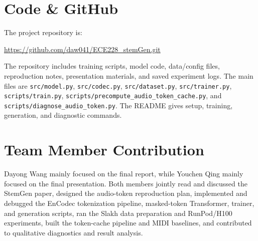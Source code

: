 \documentclass{article}
\begin{document}
\section{Code \& GitHub}

The project repository is:
\begin{center}
\url{https://github.com/daw041/ECE228_stemGen.git}
\end{center}
The repository includes training scripts, model code, data/config files, reproduction notes, presentation materials, and saved experiment logs. The main files are \texttt{src/model.py}, \texttt{src/codec.py}, \texttt{src/dataset.py}, \texttt{src/trainer.py}, \texttt{scripts/train.py}, \texttt{scripts/precompute\_audio\_token\_cache.py}, and \texttt{scripts/diagnose\_audio\_token.py}. The README gives setup, training, generation, and diagnostic commands.

\section{Team Member Contribution}

Dayong Wang mainly focused on the final report, while Youchen Qing mainly focused on the final presentation. Both members jointly read and discussed the StemGen paper, designed the audio-token reproduction plan, implemented and debugged the EnCodec tokenization pipeline, masked-token Transformer, trainer, and generation scripts, ran the Slakh data preparation and RunPod/H100 experiments, built the token-cache pipeline and MIDI baselines, and contributed to qualitative diagnostics and result analysis.
\end{document}

